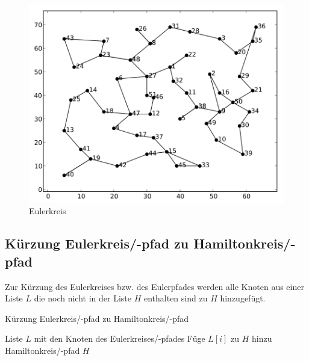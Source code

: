 \documentclass[11pt,a4paper]{article}
\begin{document}
\begin{figure}[H]
        \centering
        \includegraphics[width=11.5cm]{gfx/eil51_euler}
        \caption{Eulerkreis}
        \label{img:eil51_euler}
\end{figure}

\newpage

\subsection{Kürzung Eulerkreis/-pfad zu Hamiltonkreis/-pfad}
Zur Kürzung des Eulerkreises bzw. des Eulerpfades werden alle Knoten aus einer Liste $L$ die noch nicht in der Liste $H$ enthalten sind zu $H$ hinzugefügt.

\begin{algorithm}[H]
    \renewcommand{\algorithmicrequire}{\textbf{Eingabe:}}
    \renewcommand{\algorithmicensure}{\textbf{Ausgabe:}}
    \caption{Kürzung Eulerkreis/-pfad zu Hamiltonkreis/-pfad}

    \begin{algorithmic}[1]
    \REQUIRE Liste $L$ mit den Knoten des Eulerkreises/-pfades 
            \STATE Füge $L[i]$ zu $H$ hinzu
        \ENDIF
    \ENDFOR
    \ENSURE Hamiltonkreis/-pfad $H$
    \end{algorithmic}
\end{algorithm}
\end{document}
